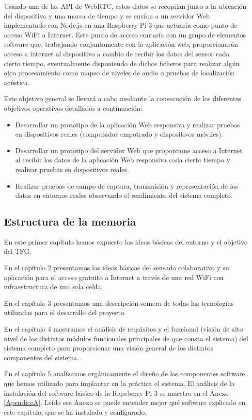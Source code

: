 Usando una de las API de WebRTC, estos datos se recopilan junto a la ubicación del dispositivo y una marca de tiempo y se envían a un servidor Web implementado con Node.js en una Raspberry Pi 3 que actuaría como punto de acceso WiFi a Internet. Este punto de acceso contaría con un grupo de elementos software que, trabajando conjuntamente con la aplicación web, proporcionarán acceso a internet al dispositivo a cambio de recibir los datos del sensor cada cierto tiempo, eventualmente disponiendo de dichos ficheros para realizar algún otro procesamiento como mapeo de niveles de audio o pruebas de localización acústica.

Este objetivo general se llevará a cabo mediante la consecución de los diferentes objetivos operativos detallados a continuación:
\begin{itemize}
\item Desarrollar un prototipo de la aplicación Web responsiva y realizar pruebas en dispositivos reales (computador empotrado y dispositivos móviles).
\item Desarrollar un prototipo del servidor Web que proporcione acceso a Internet al recibir los datos de la aplicación Web responsiva cada cierto tiempo y realizar pruebas en dispositivos reales.
\item Realizar pruebas de campo de captura, transmisión y representación de los datos en entornos reales observando el rendimiento del sistema completo.
\end{itemize}

\subsection{Estructura de la memoria}
En este primer capítulo hemos expuesto las ideas básicas del entorno y el objetivo del TFG.

En el capítulo 2 presentamos las ideas básicas del sensado colaborativo y su aplicación para el acceso gratuito a Internet a través de una red WiFi con infraestructura de una sola celda.

En el capítulo 3 presentamos una descripción somera de todas las tecnologías utilizadas para el desarrollo del proyecto.

En el capítulo 4 mostramos el análisis de requisitos y el funcional (visión de alto nivel de los distintos módulos funcionales principales de que consta el sistema) del sistema completo para proporcionar una visión general de los distintos componentes del sistema.

En el capítulo 5 analizamos orgánicamente el diseño de los componentes software que hemos utilizado para implantar en la práctica el sistema. El análisis de la instalación del software básico de la Rapsberry Pi 3 se muestra en el Anexo \ref{ApendiceA}. Leído ese Anexo se puede entender mejor qué software explicado en este capítulo, que se ha instalado y configurado.


